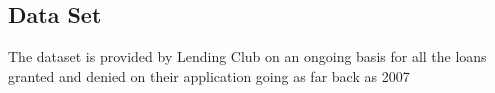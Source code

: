 \subsection{Data Set}
\cite{einstein}
The dataset is provided by Lending Club on an ongoing basis for all the loans granted and denied on their application going as far back as 2007